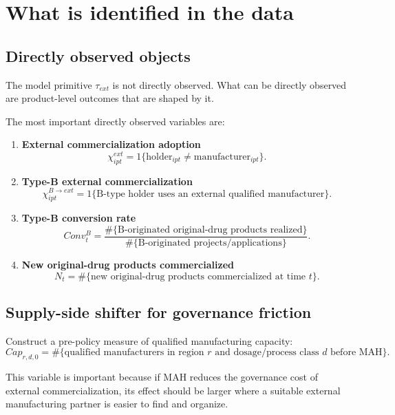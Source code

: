 \documentclass[12pt]{ctexart}
\begin{document}
\section{What is identified in the data}

\subsection{Directly observed objects}

The model primitive \(\tau_{ext}\) is not directly observed.
What can be directly observed are product-level outcomes that are shaped by it.

The most important directly observed variables are:

\begin{enumerate}[leftmargin=2em]
    \item \textbf{External commercialization adoption}
    \[
    \chi^{ext}_{ipt}=1\{\text{holder}_{ipt}\neq \text{manufacturer}_{ipt}\}.
    \]

    \item \textbf{Type-B external commercialization}
    \[
    \chi^{B\to ext}_{ipt}=1\{\text{B-type holder uses an external qualified manufacturer}\}.
    \]

    \item \textbf{Type-B conversion rate}
    \[
    Conv^B_t
    =
    \frac{\#\{\text{B-originated original-drug products realized}\}}
         {\#\{\text{B-originated projects/applications}\}}.
    \]

    \item \textbf{New original-drug products commercialized}
    \[
    N_t = \#\{\text{new original-drug products commercialized at time } t\}.
    \]
\end{enumerate}

\subsection{Supply-side shifter for governance friction}

Construct a pre-policy measure of qualified manufacturing capacity:
\[
Cap_{r,d,0}
=
\#\{\text{qualified manufacturers in region } r \text{ and dosage/process class } d \text{ before MAH}\}.
\]

This variable is important because if MAH reduces the governance cost of external commercialization,
its effect should be larger where a suitable external manufacturing partner is easier to find and organize.
\end{document}

